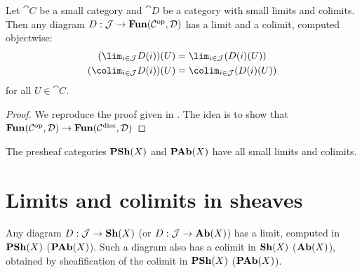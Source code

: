 \documentclass[../main.tex]{subfiles}
\begin{document}
\begin{lem}
	Let $\cat C$ be a small category and $\cat D$ be a category with small limits and colimits.
	Then any diagram $D: \mathcal{J} \to \operatorname{\mathbf{Fun}}(\mathcal{C}^{\mathrm{op}}, \mathcal{D})$ has a limit and a colimit, computed objectwise:
	\begin{align*}
    	(\lim_{i\in \cat J}D(i))(U) &= \lim_{i \in \cat J}(D(i)(U))\\
    	(\colim_{i\in \cat J}D(i))(U) &= \colim_{i \in \cat J}(D(i)(U))
    \end{align*} for all $U \in \cat C$.

\end{lem}
\begin{proof}
	We reproduce the proof given in \cite{riehlCategoryTheoryContext2016}. The idea is to show that $\operatorname{\mathbf{Fun}}(\mathcal{C}^{\mathrm{op}}, \mathcal{D}) \to \operatorname{\mathbf{Fun}}(\mathcal{C}^\text{disc}, \mathcal{D})$ 
\end{proof}

\begin{cor}
	The presheaf categories $\operatorname{\mathbf{PSh}}(X)$ and $\operatorname{\mathbf{PAb}}(X)$ have all small limits and colimits.
\end{cor}

\section{Limits and colimits in sheaves}

\begin{thm}
	Any diagram $D: \mathcal{J} \to \operatorname{\mathbf{Sh}}(X)$ (or $D: \mathcal{J} \to \operatorname{\mathbf{Ab}}(X)$) has a limit, computed in $\operatorname{\mathbf{PSh}}(X)$ ($\operatorname{\mathbf{PAb}}(X)$).
	Such a diagram also has a colimit in $\operatorname{\mathbf{Sh}}(X)$ ($\operatorname{\mathbf{Ab}}(X)$), obtained by sheafification of the colimit in $\operatorname{\mathbf{PSh}}(X)$ ($\operatorname{\mathbf{PAb}}(X)$).
\end{thm}
\end{document}

